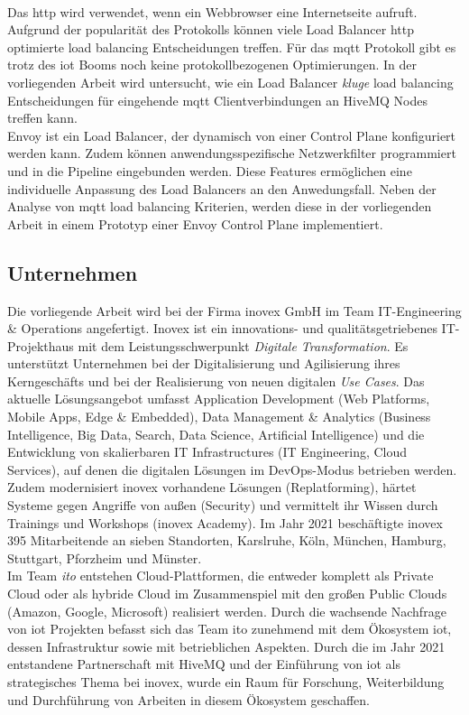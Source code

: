 \\
Das \ac{http} wird verwendet, wenn ein Webbrowser eine Internetseite aufruft. Aufgrund der popularität des Protokolls können viele Load Balancer \ac{http} optimierte load balancing Entscheidungen treffen.
Für das \ac{mqtt} Protokoll gibt es trotz des \acl{iot} Booms noch keine protokollbezogenen Optimierungen.
In der vorliegenden Arbeit wird untersucht, wie ein Load Balancer \textit{kluge} load balancing Entscheidungen für eingehende \ac{mqtt} Clientverbindungen an HiveMQ Nodes treffen kann.
\\
Envoy ist ein Load Balancer, der dynamisch von einer Control Plane konfiguriert werden kann. Zudem können anwendungsspezifische Netzwerkfilter programmiert und in die Pipeline eingebunden werden. Diese Features ermöglichen eine individuelle Anpassung des Load Balancers an den Anwedungsfall. Neben der Analyse von \ac{mqtt} load balancing Kriterien, werden diese in der vorliegenden Arbeit in einem Prototyp einer Envoy Control Plane implementiert.

\subsection{Unternehmen}
Die vorliegende Arbeit wird bei der Firma inovex GmbH im Team IT-Engineering \& Operations angefertigt.
Inovex ist ein innovations- und qualitätsgetriebenes IT-Projekthaus mit dem Leistungsschwerpunkt \textit{Digitale Transformation}.
Es unterstützt Unternehmen bei der Digitalisierung und Agilisierung ihres Kerngeschäfts und bei der Realisierung von neuen digitalen \textit{Use Cases}.
Das aktuelle Lösungsangebot umfasst Application Development (Web Platforms, Mobile Apps, Edge \& Embedded), Data Management \& Analytics (Business Intelligence, Big Data, Search, Data Science, Artificial Intelligence) und die Entwicklung von skalierbaren IT Infrastructures (IT Engineering, Cloud Services), auf denen die digitalen Lösungen im DevOps-Modus betrieben werden.
Zudem modernisiert inovex vorhandene Lösungen (Replatforming), härtet Systeme gegen Angriffe von au{\ss}en (Security) und vermittelt ihr Wissen durch Trainings und Workshops (inovex Academy).
Im Jahr 2021 beschäftigte inovex 395 Mitarbeitende an sieben Standorten, Karslruhe, Köln, München, Hamburg, Stuttgart, Pforzheim und Münster.
\\
Im Team \textit{\ac{ito}} entstehen Cloud-Plattformen, die entweder komplett als Private Cloud oder als hybride Cloud im Zusammenspiel mit den gro{\ss}en Public Clouds (Amazon, Google, Microsoft) realisiert werden.
Durch die wachsende Nachfrage von \acs{iot} Projekten befasst sich das Team \ac{ito} zunehmend mit dem Ökosystem \acl{iot}, dessen Infrastruktur sowie mit betrieblichen Aspekten.
Durch die im Jahr 2021 entstandene Partnerschaft mit HiveMQ und der Einführung von \ac{iot} als strategisches Thema bei inovex, wurde ein Raum für Forschung, Weiterbildung und Durchführung von Arbeiten in diesem Ökosystem geschaffen.

